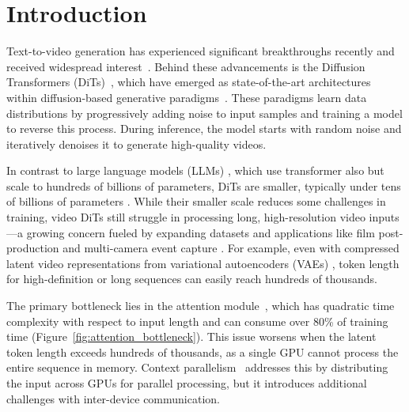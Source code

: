 \section{Introduction}

Text-to-video generation has experienced significant breakthroughs recently and received widespread interest~\cite{esser2024stablediff3, chen2023pixart, peebles2023scalableDiT, ma2024latte, klingvideo, HunyuanVideo, bao2024vidu, polyak2024movie}. Behind these advancements is the Diffusion Transformers (DiTs)~\cite{peebles2023scalableDiT,ma2024latte,Openai-sora}, which have emerged as state-of-the-art architectures within diffusion-based generative paradigms~\cite{ho2020denoisingddpm,lipman2022flowmatching}. These paradigms learn data distributions by progressively adding noise to input samples and training a model to reverse this process. During inference, the model starts with random noise and iteratively denoises it to generate high-quality videos.


In contrast to large language models (LLMs) \cite{openai2023gpt4,llama-3-1}, which use transformer also but scale to hundreds of billions of parameters, DiTs are smaller, typically under tens of billions of parameters \cite{OpenSora,yang2024cogvideox,polyak2024movie,HunyuanVideo}. While their smaller scale reduces some challenges in training, video DiTs still struggle in processing long, high-resolution video inputs---a growing concern fueled by expanding datasets and applications like film post-production and multi-camera event capture \cite{Openai-sora,polyak2024movie}. For example, even with compressed latent video representations from variational autoencoders (VAEs) \cite{stabilityai_stable_diffusion}, token length for high-definition or long sequences can easily reach hundreds of thousands.

The primary bottleneck lies in the attention module~\cite{waswani2017attention}, which has quadratic time complexity with respect to input length and can consume over 80\% of training time (Figure~\ref{fig:attention_bottleneck}). This issue worsens when the latent token length exceeds hundreds of thousands, as a single GPU cannot process the entire sequence in memory. 
{Context parallelism}~\cite{liu2023ring,fang2024usp,jacobs2023deepspeedulysses,gu2024loongtrain} addresses this by distributing the input across GPUs for parallel processing, but it introduces  additional challenges with inter-device communication.

